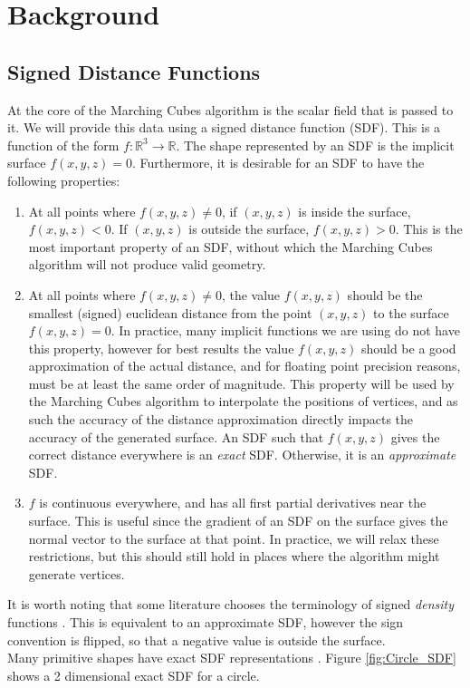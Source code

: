 \documentclass{article}
\begin{document}
\section{Background}
\subsection{Signed Distance Functions}
\label{section:sdf}
At the core of the Marching Cubes algorithm is the scalar field that is passed to it. We will provide this data using a signed distance function (SDF). This is a function of the form $f:\mathbb{R}^3 \rightarrow \mathbb{R}$. The shape represented by an SDF is the implicit surface $f\left(x,y,z\right) = 0$. Furthermore, it is desirable for an SDF to have the following properties:
\begin{enumerate}[label=\roman*.]
\item At all points where $f\left(x,y,z\right) \neq 0$, if $\left(x,y,z\right)$ is inside the surface, $f\left(x,y,z\right) < 0$. If $\left(x,y,z\right)$ is outside the surface, $f\left(x,y,z\right) > 0$. This is the most important property of an SDF, without which the Marching Cubes algorithm will not produce valid geometry.
\item At all points where $f\left(x,y,z\right) \neq 0$, the value $f\left(x,y,z\right)$ should be the smallest (signed) euclidean distance from the point $\left(x,y,z\right)$ to the surface $f\left(x,y,z\right) = 0$. In practice, many implicit functions we are using do not have this property, however for best results the value $f\left(x,y,z\right)$ should be a good approximation of the actual distance, and for floating point precision reasons, must be at least the same order of magnitude. This property will be used by the Marching Cubes algorithm to interpolate the positions of vertices, and as such the accuracy of the distance approximation directly impacts the accuracy of the generated surface. An SDF such that $f\left(x,y,z\right)$ gives the correct distance everywhere is an \textit{exact} SDF. Otherwise, it is an \textit{approximate} SDF.
\item $f$ is continuous everywhere, and has all first partial derivatives near the surface. This is useful since the gradient of an SDF on the surface gives the normal vector to the surface at that point. In practice, we will relax these restrictions, but this should still hold in places where the algorithm might generate vertices.
\end{enumerate}
It is worth noting that some literature chooses the terminology of signed \textit{density} functions \cite{nguyen_geiss_2007}. This is equivalent to an approximate SDF, however the sign convention is flipped, so that a negative value is outside the surface.\\
Many primitive shapes have exact SDF representations \cite{quilez:sdf}. Figure \ref{fig:Circle_SDF} shows a 2 dimensional exact SDF for a circle.
\end{document}
